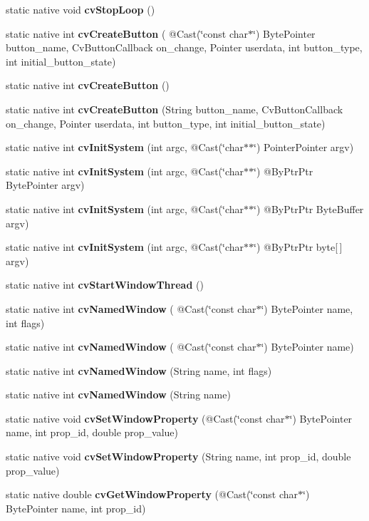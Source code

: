 \begin{DoxyCompactItemize}
\item 
static native void {\bfseries cv\+Stop\+Loop} ()
\item 
static native int {\bfseries cv\+Create\+Button} ( @Cast(\char`\"{}const char$\ast$\char`\"{}) Byte\+Pointer button\+\_\+name, Cv\+Button\+Callback on\+\_\+change, Pointer userdata, int button\+\_\+type, int initial\+\_\+button\+\_\+state)
\item 
static native int {\bfseries cv\+Create\+Button} ()
\item 
static native int {\bfseries cv\+Create\+Button} (String button\+\_\+name, Cv\+Button\+Callback on\+\_\+change, Pointer userdata, int button\+\_\+type, int initial\+\_\+button\+\_\+state)
\item 
static native int {\bfseries cv\+Init\+System} (int argc, @Cast(\char`\"{}char$\ast$$\ast$\char`\"{}) Pointer\+Pointer argv)
\item 
static native int {\bfseries cv\+Init\+System} (int argc, @Cast(\char`\"{}char$\ast$$\ast$\char`\"{}) @By\+Ptr\+Ptr Byte\+Pointer argv)
\item 
static native int {\bfseries cv\+Init\+System} (int argc, @Cast(\char`\"{}char$\ast$$\ast$\char`\"{}) @By\+Ptr\+Ptr Byte\+Buffer argv)
\item 
static native int {\bfseries cv\+Init\+System} (int argc, @Cast(\char`\"{}char$\ast$$\ast$\char`\"{}) @By\+Ptr\+Ptr byte\mbox{[}$\,$\mbox{]} argv)
\item 
static native int {\bfseries cv\+Start\+Window\+Thread} ()
\item 
static native int {\bfseries cv\+Named\+Window} ( @Cast(\char`\"{}const char$\ast$\char`\"{}) Byte\+Pointer name, int flags)
\item 
static native int {\bfseries cv\+Named\+Window} ( @Cast(\char`\"{}const char$\ast$\char`\"{}) Byte\+Pointer name)
\item 
static native int {\bfseries cv\+Named\+Window} (String name, int flags)
\item 
static native int {\bfseries cv\+Named\+Window} (String name)
\item 
static native void {\bfseries cv\+Set\+Window\+Property} (@Cast(\char`\"{}const char$\ast$\char`\"{}) Byte\+Pointer name, int prop\+\_\+id, double prop\+\_\+value)
\item 
static native void {\bfseries cv\+Set\+Window\+Property} (String name, int prop\+\_\+id, double prop\+\_\+value)
\item 
static native double {\bfseries cv\+Get\+Window\+Property} (@Cast(\char`\"{}const char$\ast$\char`\"{}) Byte\+Pointer name, int prop\+\_\+id)

\end{DoxyCompactItemize}
